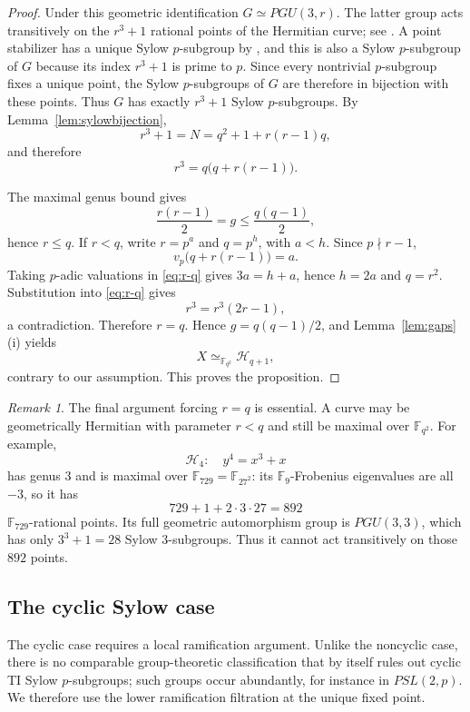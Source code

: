 \documentclass[11pt]{amsart}
\theoremstyle{remark}
\newtheorem{remark}[theorem]{Remark}
\newcommand{\F}{\mathbb F}
\newcommand{\cH}{\mathcal H}
\begin{document}
\begin{proof}
Under this geometric identification $G\simeq PGU(3,r)$.  The latter
group acts transitively on the $r^3+1$ rational points of the Hermitian
curve; see \cite[Theorem~12.24(iv)]{HKT}.  A point stabilizer has a
unique Sylow $p$-subgroup by \cite[Lemma~11.44]{HKT}, and this is also
a Sylow $p$-subgroup of $G$ because its index $r^3+1$ is prime to $p$.
Since every nontrivial $p$-subgroup fixes a unique point, the Sylow
$p$-subgroups of $G$ are therefore in bijection with these points.
Thus $G$ has exactly $r^3+1$ Sylow $p$-subgroups.  By
Lemma~\ref{lem:sylowbijection},
\[
          r^3+1=N=q^2+1+r(r-1)q,
\]
and therefore
\begin{equation}\label{eq:r-q}
          r^3=q\bigl(q+r(r-1)\bigr).
\end{equation}

The maximal genus bound gives
\[
          \frac{r(r-1)}2=g\le\frac{q(q-1)}2,
\]
hence $r\le q$.  If $r<q$, write $r=p^a$ and $q=p^h$, with $a<h$.
Since $p\nmid r-1$,
\[
          v_p\bigl(q+r(r-1)\bigr)=a.
\]
Taking $p$-adic valuations in \eqref{eq:r-q} gives
$3a=h+a$, hence $h=2a$ and $q=r^2$.  Substitution into
\eqref{eq:r-q} gives
\[
          r^3=r^3(2r-1),
\]
a contradiction.  Therefore $r=q$.  Hence
$g=q(q-1)/2$, and Lemma~\ref{lem:gaps}(i) yields
\[
          X\simeq_{\F_{q^2}}\cH_{q+1},
\]
contrary to our assumption.  This proves the proposition.
\end{proof}

\begin{remark}\label{rem:ree-and-geometric-hermitian}
The final argument forcing $r=q$ is essential.  A curve may be
geometrically Hermitian with parameter $r<q$ and still be maximal over
$\F_{q^2}$.  For example,
\[
          \cH_4:\quad y^4=x^3+x
\]
has genus $3$ and is maximal over
$\F_{729}=\F_{27^2}$: its $\F_9$-Frobenius eigenvalues are all $-3$,
so it has
\[
          729+1+2\cdot3\cdot27=892
\]
$\F_{729}$-rational points.  Its full geometric automorphism group is
$PGU(3,3)$, which has only $3^3+1=28$ Sylow $3$-subgroups.  Thus it
cannot act transitively on those $892$ points.
\end{remark}

\subsection{The cyclic Sylow case}

The cyclic case requires a local ramification argument.  Unlike the
noncyclic case, there is no comparable group-theoretic classification
that by itself rules out cyclic TI Sylow $p$-subgroups; such groups occur
abundantly, for instance in $PSL(2,p)$.  We therefore use the lower
ramification filtration at the unique fixed point.
\end{document}
